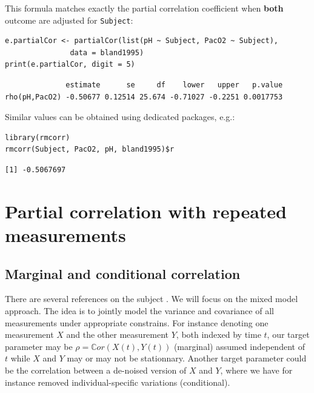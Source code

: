 \documentclass[12pt]{article}
\begin{document}
This formula matches exactly the partial correlation coefficient when
\textbf{both} outcome are adjusted for \texttt{Subject}:
\lstset{language=r,label= ,caption= ,captionpos=b,numbers=none}
\begin{lstlisting}
e.partialCor <- partialCor(list(pH ~ Subject, PacO2 ~ Subject),
			   data = bland1995)
print(e.partialCor, digit = 5)
\end{lstlisting}

\begin{verbatim}
              estimate      se     df    lower   upper   p.value
rho(pH,PacO2) -0.50677 0.12514 25.674 -0.71027 -0.2251 0.0017753
\end{verbatim}


Similar values can be obtained using dedicated packages, e.g.:
\lstset{language=r,label= ,caption= ,captionpos=b,numbers=none}
\begin{lstlisting}
library(rmcorr)
rmcorr(Subject, PacO2, pH, bland1995)$r
\end{lstlisting}

\begin{verbatim}
[1] -0.5067697
\end{verbatim}


\clearpage

\section{Partial correlation with repeated measurements}
\label{sec:org2328ed5}

\subsection{Marginal and conditional correlation}
\label{sec:org144b47e}
There are several references on the subject
\citep{bland1995calculating,Lipsitz2001partial,bakdash2017repeated,shan2020correlation}. We
will focus on the mixed model approach. The idea is to jointly model
the variance and covariance of all measurements under appropriate
constrains. For instance denoting one measurement \(X\) and the other
measurement \(Y\), both indexed by time \(t\), our target parameter
may be \(\rho = \mathbb{C}or(X(t),Y(t))\) (marginal) assumed independent of
\(t\) while \(X\) and \(Y\) may or may not be stationnary. Another
target parameter could be the correlation between a de-noised version
of \(X\) and \(Y\), where we have for instance removed
individual-specific variations (conditional).

\bigskip
\end{document}
